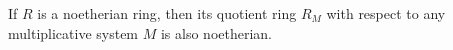 If $R$ is a noetherian ring, then its quotient ring $R_M$ with respect to any multiplicative system $M$ is also noetherian.
